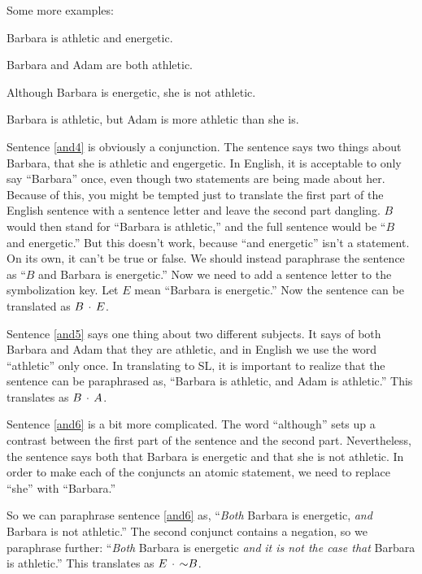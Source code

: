 Some more examples:
\begin{earg}
\item[\ex{and4}]Barbara is athletic and energetic.
\item[\ex{and5}]Barbara and Adam are both athletic.
\item[\ex{and6}]Although Barbara is energetic, she is not athletic.
\item[\ex{and7}]Barbara is athletic, but Adam is more athletic than she is.
\end{earg}

Sentence \ref{and4} is obviously a conjunction. The sentence says two things about Barbara, that she is athletic and engergetic. In English, it is acceptable to only say ``Barbara'' once, even though two statements are being made about her. Because of this, you might be tempted just to translate the first part of the English sentence with a sentence letter and leave the second part dangling.  $B$ would then stand for ``Barbara is athletic,'' and the full sentence would be ``$B$ and energetic.'' But this doesn't work, because ``and energetic'' isn't a statement. On its own, it can't be true or false. We should instead paraphrase the sentence as ``$B$ and Barbara is energetic.'' Now we need to add a sentence letter to the symbolization key. Let $E$ mean ``Barbara is energetic.'' Now the sentence can be translated as $B \,\cdot\, E$.


Sentence \ref{and5} says one thing about two different subjects. It says of both Barbara and Adam that they are athletic, and in English we use the word ``athletic'' only once. In translating to SL, it is important to realize that the sentence can be paraphrased as, ``Barbara is athletic, and Adam is athletic.'' This translates as $B \,\cdot\, A$.

Sentence \ref{and6} is a bit more complicated. The word ``although'' sets up a contrast between the first part of the sentence and the second part. Nevertheless, the sentence says both that Barbara is energetic and that she is not athletic. In order to make each of the conjuncts an atomic statement, we need to replace ``she'' with ``Barbara.''

So we can paraphrase sentence \ref{and6} as, ``\emph{Both} Barbara is energetic, \emph{and} Barbara is not athletic.'' The second conjunct contains a negation, so we paraphrase further: ``\emph{Both} Barbara is energetic \emph{and} \emph{it is not the case that} Barbara is athletic.'' This translates as $E \,\cdot\, \mathord{\sim} B$.

